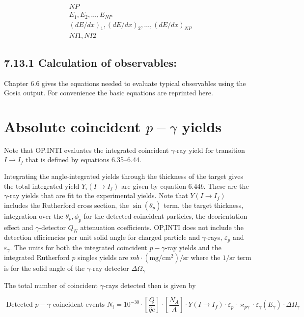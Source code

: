 \documentclass[10pt]{article}
\begin{document}
$$
\begin{aligned}
& N P \\
& E_{1}, E_{2}, \ldots, E_{N P} \\
& (d E / d x)_{1},(d E / d x)_{2}, \ldots,(d E / d x)_{N P} \\
& N I 1, N I 2
\end{aligned}
$$

\subsection*{7.13.1 Calculation of observables:}
Chapter 6.6 gives the equations needed to evaluate typical observables using the Gosia output. For convenience the basic equations are reprinted here.

\section*{Absolute coincident $p-\gamma$ yields}
Note that OP.INTI evaluates the integrated coincident $\gamma$-ray yield for transition $I \rightarrow I_{f}$ that is defined by equations 6.35--6.44.

Integrating the angle-integrated yields through the thickness of the target gives the total integrated yield $Y_{i}\left(I \rightarrow I_{f}\right)$ are given by equation $6.44 b$. These are the $\gamma$-ray yields that are fit to the experimental yields. Note that $Y\left(I \rightarrow I_{f}\right)$ includes the Rutherford cross section, the $\sin \left(\theta_{p}\right)$ term, the target thickness, integration over the $\theta_{p}, \phi_{p}$ for the detected coincident particles, the deorientation effect and $\gamma$-detector $Q_{K}$ attenuation coefficients. OP,INTI does not include the detection efficiencies per unit solid angle for charged particle and $\gamma$-rays, $\varepsilon_{p}$ and $\varepsilon_{\gamma}$. The units for both the integrated coincident $p-\gamma$-ray yields and the integrated Rutherford $p$ singles yields are $m b \cdot\left(\mathrm{mg} / \mathrm{cm}^{2}\right) / \mathrm{sr}$ where the $1 / \mathrm{sr}$ term is for the solid angle of the $\gamma$-ray detector $\Delta \Omega_{\gamma}$

The total number of coincident $\gamma$-rays detected then is given by


\begin{equation*}
\text { Detected } p-\gamma \text { coincident events } N_{i}=10^{-30} \cdot\left[\frac{Q}{\hat{q} e}\right] \cdot\left[\frac{N_{A}}{A}\right] \cdot Y\left(I \rightarrow I_{f}\right) \cdot \varepsilon_{p} \cdot \varkappa_{p \gamma} \cdot \varepsilon_{\gamma}\left(E_{\gamma}\right) \cdot \Delta \Omega_{\gamma} \tag{6.65}
\end{equation*}
\end{document}
